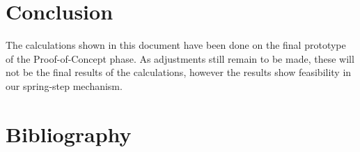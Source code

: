 \documentclass[a4paper]{article}
\begin{document}
\section{Conclusion}
The calculations shown in this document have been done on the final prototype of
the Proof-of-Concept phase. As adjustments still remain to be made, these will
not be the final results of the calculations, however the results show
feasibility in our spring-step mechanism.

\section{Bibliography}


\end{document}
